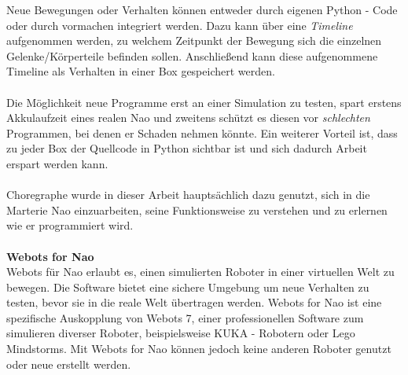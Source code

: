 Neue Bewegungen oder Verhalten können entweder durch eigenen Python - Code oder durch vormachen integriert werden. Dazu kann über eine \textit{Timeline} aufgenommen werden, zu welchem Zeitpunkt der Bewegung sich die einzelnen Gelenke/Körperteile befinden sollen. Anschließend kann diese aufgenommene Timeline als Verhalten in einer Box gespeichert werden.
\\
\\
Die Möglichkeit neue Programme erst an einer Simulation zu testen, spart erstens Akkulaufzeit eines realen Nao und zweitens schützt es diesen vor \textit{schlechten} Programmen, bei denen er Schaden nehmen könnte. Ein weiterer Vorteil ist, dass zu jeder Box der Quellcode in Python sichtbar ist und sich dadurch Arbeit erspart werden kann.
\\
\\
Choregraphe wurde in dieser Arbeit hauptsächlich dazu genutzt, sich in die Marterie Nao einzuarbeiten, seine Funktionsweise zu verstehen und zu erlernen wie er programmiert wird.
\\
\\
\textbf{Webots for Nao}
\\
Webots für Nao erlaubt es, einen simulierten Roboter in einer virtuellen Welt zu bewegen. Die Software bietet eine sichere Umgebung um neue Verhalten zu testen, bevor sie in die reale Welt übertragen werden. Webots for Nao ist eine spezifische Auskopplung von Webots 7, einer professionellen Software zum simulieren diverser Roboter, beispielsweise KUKA - Robotern oder Lego Mindstorms. Mit Webots for Nao können jedoch keine anderen Roboter genutzt oder neue erstellt werden.

